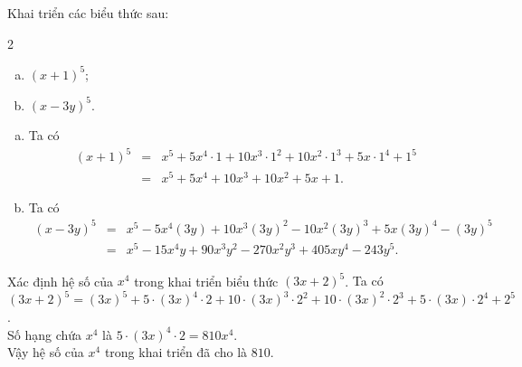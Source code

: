 \begin{bt}%
	Khai triển các biểu thức sau:
	\begin{multicols}{2}
		\begin{enumerate}[a)]
			\item $(x+1)^5$;
			\item $(x-3y)^5$.
		\end{enumerate}
	\end{multicols}
	\loigiai
	{\begin{enumerate}[a)]
			\item Ta có \begin{eqnarray*}
				(x+1)^5&=& x^5+5x^4\cdot 1+10x^3\cdot 1^2+10x^2\cdot 1^3+5x\cdot 1^4+1^5\\
				&=&x^5+5x^4+10x^3+10x^2+5x+1.
			\end{eqnarray*}
			\item Ta có \begin{eqnarray*}
				(x-3y)^5&=& x^5-5x^4(3y)+10x^3(3y)^2-10x^2(3y)^3+5x(3y)^4-(3y)^5\\
				&=&x^5-15x^4y+90x^3y^2-270x^2y^3+405xy^4-243y^5.
			\end{eqnarray*}
		\end{enumerate}
	}
\end{bt}

\begin{bt}%
	Xác định hệ số của $x^4$ trong khai triển biểu thức $(3x+2)^5$.
	\loigiai
	{Ta có $
		(3x+2)^5=(3x)^5+5\cdot (3x)^4\cdot 2+10\cdot (3x)^3\cdot 2^2+10\cdot (3x)^2\cdot 2^3+5\cdot (3x)\cdot 2^4+2^5$.\\
		Số hạng chứa $x^4$ là $5\cdot (3x)^4\cdot 2=810x^4$.\\
		Vậy hệ số của $x^4$ trong khai triển đã cho là $810$.
	}
\end{bt}

